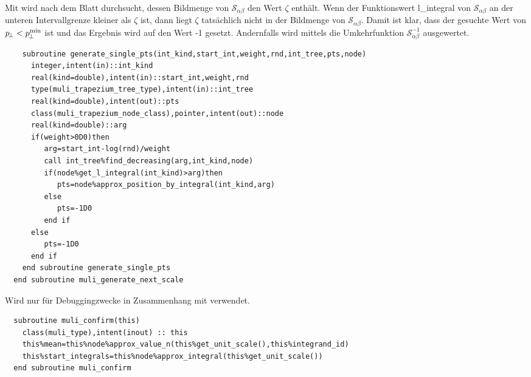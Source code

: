 Mit  wird  nach dem Blatt durchsucht, dessen Bildmenge von $\mathcal{S}_{\alpha\beta}$ den Wert $\zeta$ enthält. Wenn der Funktionswert l\_integral von $\mathcal{S}_{\alpha\beta}$ an der unteren Intervallgrenze kleiner als $\zeta$ ist, dann liegt $\zeta$ tatsächlich nicht in der Bildmenge von $\mathcal{S}_{\alpha\beta}$. Damit ist klar, dass der gesuchte Wert von $p_{\!\perp}<p_{\!\perp}^{\min}$ ist und das Ergebnis wird auf den Wert -1 gesetzt. Andernfalls wird mittels  die Umkehrfunktion $\mathcal{S}_{\alpha\beta}^{-1}$ ausgewertet.
\begin{Verbatim}
    subroutine generate_single_pts(int_kind,start_int,weight,rnd,int_tree,pts,node)
      integer,intent(in)::int_kind
      real(kind=double),intent(in)::start_int,weight,rnd
      type(muli_trapezium_tree_type),intent(in)::int_tree
      real(kind=double),intent(out)::pts
      class(muli_trapezium_node_class),pointer,intent(out)::node
      real(kind=double)::arg
      if(weight>0D0)then
         arg=start_int-log(rnd)/weight
         call int_tree%find_decreasing(arg,int_kind,node)
         if(node%get_l_integral(int_kind)>arg)then
            pts=node%approx_position_by_integral(int_kind,arg)
         else
            pts=-1D0
         end if
      else
         pts=-1D0
      end if
    end subroutine generate_single_pts
  end subroutine muli_generate_next_scale
\end{Verbatim}
Wird nur für Debuggingzwecke in Zusammenhang mit  verwendet.
\begin{Verbatim}
  subroutine muli_confirm(this)
    class(muli_type),intent(inout) :: this
    this%mean=this%node%approx_value_n(this%get_unit_scale(),this%integrand_id)
    this%start_integrals=this%node%approx_integral(this%get_unit_scale())
  end subroutine muli_confirm
\end{Verbatim}

